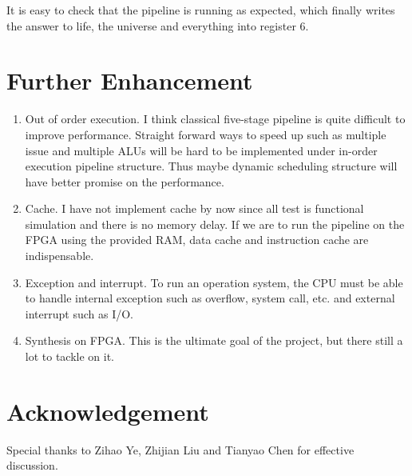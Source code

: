 \documentclass[paper=a4, fontsize=11pt]{scrartcl} %
\numberwithin{equation}{section} %
\numberwithin{figure}{section} %
\numberwithin{table}{section} %
\begin{document}
\begin{spacing}{1.5}
\begin{enumerate}
		It is easy to check that the pipeline is running as expected, which finally writes the answer to life, the universe and everything into register 6.
	\end{enumerate}
\section{Further Enhancement}
	\begin{enumerate}
		\item Out of order execution. I think classical five-stage pipeline is quite difficult to improve performance. Straight forward ways to speed up such as multiple issue and multiple ALUs will be hard to be implemented under in-order execution pipeline structure. Thus maybe dynamic scheduling structure will have better promise on the performance.
		\item Cache. I have not implement cache by now since all test is functional simulation and there is no memory delay. If we are to run the pipeline on the FPGA using the provided RAM, data cache and instruction cache are indispensable.
		\item Exception and interrupt. To run an operation system, the CPU must be able to handle internal exception such as overflow, system call, etc. and external interrupt such as I/O.
		\item Synthesis on FPGA. This is the ultimate goal of the project, but there still a lot to tackle on it.
	\end{enumerate}
	\section{Acknowledgement}
	Special thanks to Zihao Ye, Zhijian Liu and Tianyao Chen for effective discussion.
\newpage
\nocite{*}


\newpage
\renewcommand{\appendixpagename}{\scshape \Large \mdseries \rmfamily Appendices}
\begin{appendices}
    \renewcommand{\thesection}{\Alph{section}}
    

\end{appendices}
\end{spacing}
\end{document}
